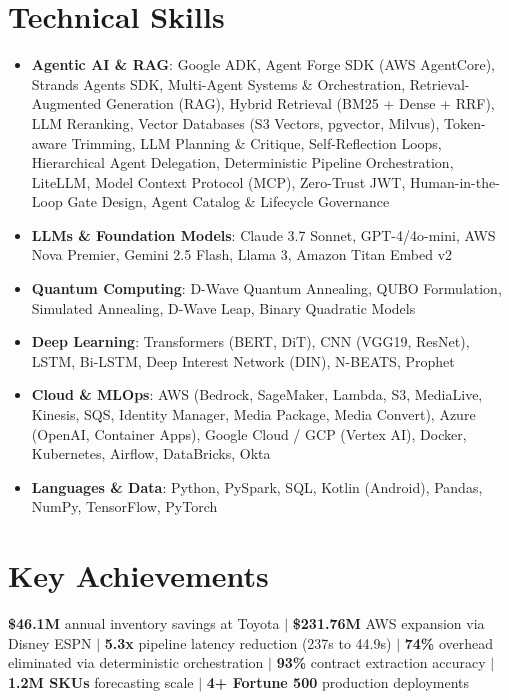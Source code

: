 \documentclass[letterpaper,10pt]{article}
\begin{document}
\section{Technical Skills}
 \begin{itemize}[leftmargin=0.15in, label={}, itemsep=4pt]
    \small
    \item \textbf{Agentic AI \& RAG}{: Google ADK, Agent Forge SDK (AWS AgentCore), Strands Agents SDK, Multi-Agent Systems \& Orchestration, Retrieval-Augmented Generation (RAG), Hybrid Retrieval (BM25 + Dense + RRF), LLM Reranking, Vector Databases (S3 Vectors, pgvector, Milvus), Token-aware Trimming, LLM Planning \& Critique, Self-Reflection Loops, Hierarchical Agent Delegation, Deterministic Pipeline Orchestration, LiteLLM, Model Context Protocol (MCP), Zero-Trust JWT, Human-in-the-Loop Gate Design, Agent Catalog \& Lifecycle Governance}
    \item \textbf{LLMs \& Foundation Models}{: Claude 3.7 Sonnet, GPT-4/4o-mini, AWS Nova Premier, Gemini 2.5 Flash, Llama 3, Amazon Titan Embed v2}
    \item \textbf{Quantum Computing}{: D-Wave Quantum Annealing, QUBO Formulation, Simulated Annealing, D-Wave Leap, Binary Quadratic Models}
    \item \textbf{Deep Learning}{: Transformers (BERT, DiT), CNN (VGG19, ResNet), LSTM, Bi-LSTM, Deep Interest Network (DIN), N-BEATS, Prophet}
    \item \textbf{Cloud \& MLOps}{: AWS (Bedrock, SageMaker, Lambda, S3, MediaLive, Kinesis, SQS, Identity Manager, Media Package, Media Convert), Azure (OpenAI, Container Apps), Google Cloud / GCP (Vertex AI), Docker, Kubernetes, Airflow, DataBricks, Okta}
    \item \textbf{Languages \& Data}{: Python, PySpark, SQL, Kotlin (Android), Pandas, NumPy, TensorFlow, PyTorch}
 \end{itemize}


\section{Key Achievements}
 \begin{itemize}[leftmargin=0.15in, label={}]
    \small{\item{
     \textbf{\$46.1M} annual inventory savings at Toyota $|$ 
     \textbf{\$231.76M} AWS expansion via Disney ESPN $|$ 
     \textbf{5.3x} pipeline latency reduction (237s to 44.9s) $|$ 
     \textbf{74\%} overhead eliminated via deterministic orchestration $|$
     \textbf{93\%} contract extraction accuracy $|$ 
     \textbf{1.2M SKUs} forecasting scale $|$ 
     \textbf{4+ Fortune 500} production deployments
    }}
 \end{itemize}


\end{document}
